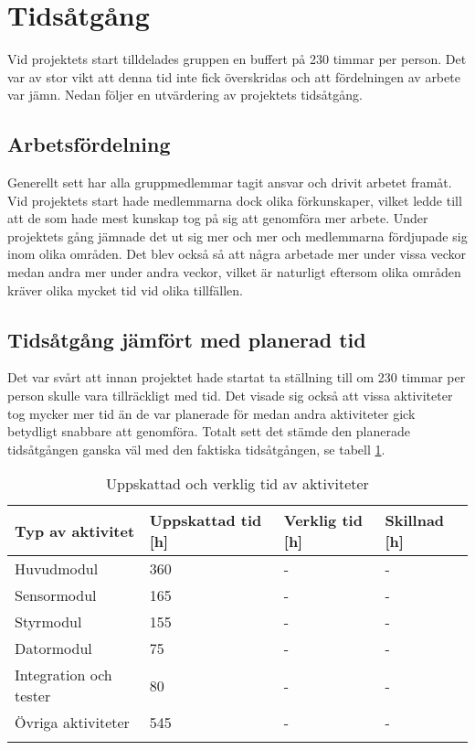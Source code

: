 \documentclass[11pt]{article}
\begin{document}
\pagebreak
{}

\section{Tidsåtgång}
Vid projektets start tilldelades gruppen en buffert på 230 timmar per person. Det var av stor vikt att denna tid inte fick överskridas och att fördelningen av arbete var jämn. Nedan följer en utvärdering av projektets tidsåtgång.

\subsection{Arbetsfördelning}
Generellt sett har alla gruppmedlemmar tagit ansvar och drivit arbetet framåt. Vid projektets start hade medlemmarna dock olika förkunskaper, vilket ledde till att de som hade mest kunskap tog på sig att genomföra mer arbete. Under projektets gång jämnade det ut sig mer och mer och medlemmarna fördjupade sig inom olika områden. Det blev också så att några arbetade mer under vissa veckor medan andra mer under andra veckor, vilket är naturligt eftersom olika områden kräver olika mycket tid vid olika tillfällen.

\subsection{Tidsåtgång jämfört med planerad tid}
Det var svårt att innan projektet hade startat ta ställning till om 230 timmar per person skulle vara tillräckligt med tid. Det visade sig också att vissa aktiviteter tog mycker mer tid än de var planerade för medan andra aktiviteter gick betydligt snabbare att genomföra. Totalt sett det stämde den planerade tidsåtgången ganska väl med den faktiska tidsåtgången, se tabell \ref{tid}.



\begin{longtable}{|l|l|l|l|} \hline
\centering
\textbf{Typ av aktivitet} & \textbf{Uppskattad tid [h]} & \textbf{Verklig tid [h]} & \textbf{Skillnad [h]} \\ \hline
Huvudmodul & 360 & - & -\\ \hline
Sensormodul & 165 & -& -\\ \hline
Styrmodul & 155 & - & - \\ \hline
Datormodul & 75 & - & -\\ \hline
Integration och tester & 80 & - & -\\ \hline
Övriga aktiviteter & 545 & - & -\\ \hline
\caption{Uppskattad och verklig tid av aktiviteter} \label{tid}
\end{longtable}
\end{document}
